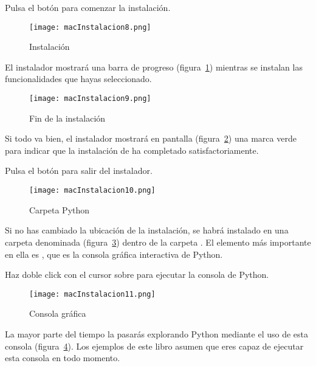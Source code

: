 Pulsa el botón  para comenzar la instalación.

\begin{figure}[!h]
  \begin{center}
\texttt{[image: macInstalacion8.png]}
\caption{Instalación}\label{figm08}
  \end{center}
\end{figure}

El instalador mostrará una barra de progreso (figura~\ref{figm08}) mientras se instalan las funcionalidades que hayas seleccionado.

\begin{figure}[!h]
  \begin{center}
\texttt{[image: macInstalacion9.png]}
\caption{Fin de la instalación}\label{figm09}
  \end{center}
\end{figure}

Si todo va bien, el instalador mostrará en pantalla (figura~\ref{figm09}) una marca verde para indicar que la instalación de ha completado satisfactoriamente.

Pulsa el botón  para salir del instalador.

\begin{figure}[!h]
  \begin{center}
\texttt{[image: macInstalacion10.png]}
\caption{Carpeta Python}\label{figm010}
  \end{center}
\end{figure}

Si no has cambiado la ubicación de la instalación,  se habrá instalado en una carpeta denominada  (figura~\ref{figm010}) dentro de la carpeta . El elemento más importante en ella es , que es la consola gráfica interactiva de Python.

Haz doble click con el cursor sobre  para ejecutar la consola de Python.

\begin{figure}[!h]
  \begin{center}
\texttt{[image: macInstalacion11.png]}
\caption{Consola gráfica}\label{figm011}
  \end{center}
\end{figure}

La mayor parte del tiempo la pasarás explorando Python mediante el uso de esta consola (figura~\ref{figm011}). Los ejemplos de este libro asumen que eres capaz de ejecutar esta consola en todo momento.

